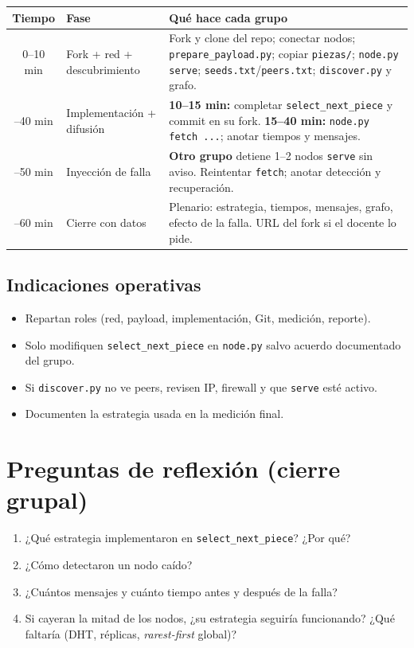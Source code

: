 \documentclass[12pt,a4paper]{article}
\begin{document}
\begin{center}
\begin{tabular}{@{}clp{8.5cm}@{}}
\toprule
\textbf{Tiempo} & \textbf{Fase} & \textbf{Qué hace cada grupo} \\
\midrule
0--10 min &
Fork + red + descubrimiento &
Fork y clone del repo; conectar nodos; \texttt{prepare\_payload.py}; copiar \texttt{piezas/}; \texttt{node.py serve}; \texttt{seeds.txt}/\texttt{peers.txt}; \texttt{discover.py} y grafo. \\
\addlinespace
10--40 min &
Implementación + difusión &
\textbf{10--15 min:} completar \texttt{select\_next\_piece} y commit en su fork. \textbf{15--40 min:} \texttt{node.py fetch ...}; anotar tiempos y mensajes. \\
\addlinespace
40--50 min &
Inyección de falla &
\textbf{Otro grupo} detiene 1--2 nodos \texttt{serve} sin aviso. Reintentar \texttt{fetch}; anotar detección y recuperación. \\
\addlinespace
50--60 min &
Cierre con datos &
Plenario: estrategia, tiempos, mensajes, grafo, efecto de la falla. URL del fork si el docente lo pide. \\
\bottomrule
\end{tabular}
\end{center}

\subsection{Indicaciones operativas}

\begin{itemize}
    \item Repartan roles (red, payload, implementación, Git, medición, reporte).
    \item Solo modifiquen \texttt{select\_next\_piece} en \texttt{node.py} salvo acuerdo documentado del grupo.
    \item Si \texttt{discover.py} no ve peers, revisen IP, firewall y que \texttt{serve} esté activo.
    \item Documenten la estrategia usada en la medición final.
\end{itemize}

\section{Preguntas de reflexión (cierre grupal)}

\begin{enumerate}
    \item ¿Qué estrategia implementaron en \texttt{select\_next\_piece}? ¿Por qué?
    \item ¿Cómo detectaron un nodo caído?
    \item ¿Cuántos mensajes y cuánto tiempo antes y después de la falla?
    \item Si cayeran la mitad de los nodos, ¿su estrategia seguiría funcionando? ¿Qué faltaría (DHT, réplicas, \emph{rarest-first} global)?
\end{enumerate}
\end{document}
